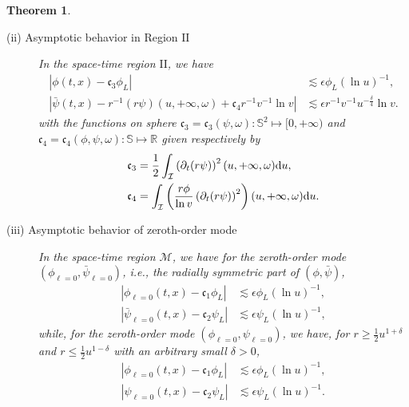 \documentclass[a4paper,reqno]{amsart}
\newtheorem{theorem}{Theorem}[section]
\theoremstyle{definition}
\numberwithin{equation}{section}
\def \R {{\mathbb{R} }}
\def \d {{\rm{d}}}
\def \pt{\partial_{t}}
\def\MM{\mathcal{M}}
\def\ep{\epsilon}
\def\de{\delta}
\begin{document}
\begin{theorem}
\begin{description}
         \item [ (ii) Asymptotic behavior in \textrm{Region} $\mathrm{II}$]
         In the space-time region $\mathrm{II}$, we have
         \begin{equation}
     \begin{aligned}
         \left|\phi(t,x)-\mathfrak{c}_{3}\phi_{L}\right|&\lesssim
        \ep \phi_{L}(\ln u)^{-1},\\
        \left|\bar{\psi}(t,x)-r^{-1}{(r\psi)}(u,+\infty,\omega)+\mathfrak{c}_{4}r^{-1}v^{-1}\ln v\right|&\lesssim \ep r^{-1}v^{-1}u^{-\frac{\delta}{4}}\ln v.
         \end{aligned}
         \end{equation}
with the functions on sphere $\mathfrak{c}_{3}={\mathfrak{c}_{3}(\psi, \omega)}:\mathbb{S}^{2}\mapsto [0,+\infty)$ and $\mathfrak{c}_{4}={\mathfrak{c}_{4}(\phi,\psi, \omega)}:\mathbb{S}\mapsto \R$ given respectively by 
         \begin{equation}
         \label{def:cfrak3and4:intro}
             \begin{aligned}
                 \mathfrak{c}_{3}&=\frac{1}{2}\int_{\mathcal{I}}
                 \left(\pt (r\psi)\right)^{2}(u,+\infty{,\omega})\d u,\\
                 \mathfrak{c}_{4}&=\int_{\mathcal{I}}
                 \left(\frac{r\phi}{\ln v}
                 \left(\pt (r\psi)\right)^{2}\right)(u,+\infty{,\omega})\d u.
             \end{aligned}
         \end{equation}

           \item [ (iii) Asymptotic behavior of zeroth-order mode] In the space-time region $\MM$, we have for the zeroth-order mode $(\phi_{\ell=0},\bar{\psi}_{\ell=0})$, i.e., the radially symmetric part of $(\phi,\bar{\psi})$,  
     \begin{equation}
     \begin{aligned}
         \left|\phi_{\ell=0}(t,x)-\mathfrak{c}_{1}\phi_{L}\right|&\lesssim\ep 
         \phi_{L}(\ln u)^{-1},\\
         \left|\bar{\psi}_{\ell=0}(t,x)-\mathfrak{c}_{2}\psi_{L}\right|&\lesssim \ep \psi_{L}(\ln u)^{-1},
         \end{aligned}
         \end{equation}
while, for the zeroth-order mode $(\phi_{\ell=0},{\psi}_{\ell=0})$, we have, for $r\geq \frac{1}{2}u^{1+\delta}$ and $r\leq \frac{1}{2}u^{1-\delta}$ with an arbitrary small $\de>0$,
  \begin{equation}
     \begin{aligned}
         \left|\phi_{\ell=0}(t,x)-\mathfrak{c}_{1}\phi_{L}\right|&\lesssim\ep 
         \phi_{L}(\ln u)^{-1},\\
         \left|\psi_{\ell=0}(t,x)-\mathfrak{c}_{2}\psi_{L}\right|&\lesssim \ep \psi_{L}(\ln u)^{-1}.
         \end{aligned}
         \end{equation}
 \end{description}


\end{theorem}
\end{document}
